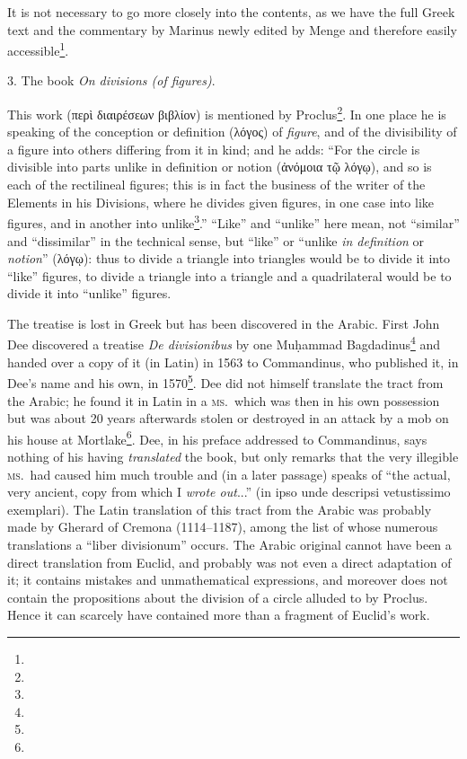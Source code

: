 It is not necessary to go more closely into the contents, as we have the full Greek text and the commentary by Marinus newly edited by Menge and therefore easily accessible\footnote{}.

3. The book \emph{On divisions (of figures)}.

This work (περὶ διαιρέσεων βιβλίον) is mentioned by Proclus\footnote{}. In one place he is speaking of the conception or definition (λόγος) of \emph{figure}, and of the divisibility of a figure into others differing from it in kind; and he adds: ``For the circle is divisible into parts unlike in definition or notion (ἀνόμοια τῷ λόγῳ), and so is each of the rectilineal figures; this is in fact the business of the writer of the Elements in his Divisions, where he divides given figures, in one case into like figures, and in another into unlike\footnote{}.'' ``Like'' and ``unlike'' here mean, not ``similar'' and ``dissimilar'' in the technical sense, but ``like'' or ``unlike \emph{in definition} or \emph{notion}'' (λόγῳ): thus to divide a triangle into triangles would be to divide it into ``like'' figures, to divide a triangle into a triangle and a quadrilateral would be to divide it into ``unlike'' figures.

The treatise is lost in Greek but has been discovered in the Arabic. First John Dee discovered a treatise \emph{De divisionibus} by one Muḥammad Bagdadinus\footnote{} and handed over a copy of it (in Latin) in 1563 to Commandinus, who published it, in Dee's name and his own, in 1570\footnote{}. Dee did not himself translate the tract from the Arabic; he found it in Latin in a \textsc{ms.}\ which was then in his own possession but was about 20 years afterwards stolen or destroyed in an attack by a mob on his house at Mortlake\footnote{}. Dee, in his preface addressed to Commandinus, says nothing of his having \emph{translated} the book, but only remarks that the very illegible \textsc{ms.}\ had caused him much trouble and (in a later passage) speaks of ``the actual, very ancient, copy from which I \emph{wrote out}...'' (in ipso unde descripsi vetustissimo exemplari). The Latin translation of this tract from the Arabic was probably made by Gherard of Cremona (1114--1187), among the list of whose numerous translations a ``liber divisionum'' occurs. The Arabic original cannot have been a direct translation from Euclid, and probably was not even a direct adaptation of it; it contains mistakes and unmathematical expressions, and moreover does not contain the propositions about the division of a circle alluded to by Proclus. Hence it can scarcely have contained more than a fragment of Euclid's work.

